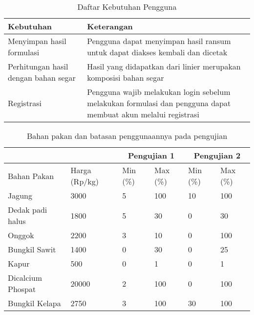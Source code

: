 \begin{table}[h!]
	\centering
	\caption{Daftar Kebutuhan Pengguna}
	\label{my-label}
	\begin{tabular}{ p{2.5cm}p{5cm}  }
		\hline
		Kebutuhan                            & Keterangan                                                                                                    \\ \hline
		Menyimpan hasil formulasi            & Pengguna dapat menyimpan hasil ransum untuk dapat diakses kembali dan dicetak                                 \\
		Perhitungan hasil dengan bahan segar & Hasil yang didapatkan dari linier merupakan komposisi bahan segar                                             \\
		Registrasi                           & Pengguna wajib melakukan login sebelum melakukan formulasi dan pengguna dapat membuat akun melalui registrasi	   \\ \hline
	\end{tabular}
\end{table}

\begin{table}[h!]
	\centering
	\caption{Bahan pakan dan batasan penggunaannya pada pengujian}
	\label{my-label}
	\begin{tabular}{p{2.5cm}p{1cm}p{0.5cm}p{0.5cm}p{0.5cm}p{0.5cm}}
		\hline
		&&\multicolumn{2}{c}{Pengujian 1} & \multicolumn{2}{c}{Pengujian 2} \\ \hline
		Bahan Pakan       & Harga (Rp/kg) & Min (\%) & Max (\%) & Min (\%) & Max (\%) \\ \hline
		Jagung            & 3000          & 5        & 100      & 10       & 100      \\
		Dedak padi halus  & 1800          & 5        & 30       & 0        & 30       \\
		Onggok            & 2200          & 3        & 10       & 0        & 100      \\
		Bungkil Sawit     & 1400          & 0        & 30       & 0        & 25       \\
		Kapur             & 500           & 0        & 1        & 0        & 1        \\
		Dicalcium Phospat & 20000         & 2        & 100      & 0        & 100      \\
		Bungkil Kelapa    & 2750          & 3        & 100      & 30       & 100      \\ \hline
	\end{tabular}
\end{table}

